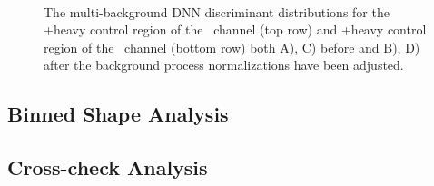 \begin{figure}[htbp]
  \centering
  \mbox{
  }
  \mbox{
  }
  \caption[Multi-background DNN Discriminant Distributions]{The multi-background DNN discriminant distributions for the \bosW+heavy control region of the \WlnH\ channel (top row) and \bosZ+heavy control region of the \ZnnH\ channel (bottom row) both A), C) before and B), D) after the background process normalizations have been adjusted.}
  \label{fig:DNN_multi}
\end{figure}

\subsection{Binned Shape Analysis}

\subsection{Cross-check Analysis}

